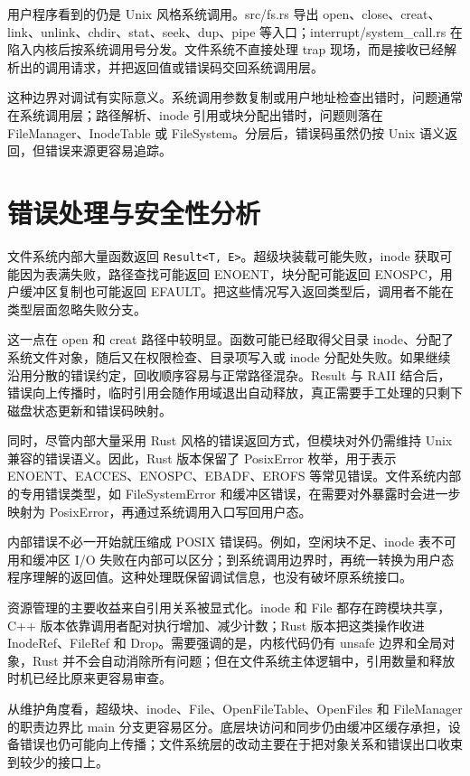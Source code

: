 用户程序看到的仍是 Unix 风格系统调用。src/fs.rs 导出 open、close、creat、link、unlink、chdir、stat、seek、dup、pipe 等入口；interrupt/system\_call.rs 在陷入内核后按系统调用号分发。文件系统不直接处理 trap 现场，而是接收已经解析出的调用请求，并把返回值或错误码交回系统调用层。

这种边界对调试有实际意义。系统调用参数复制或用户地址检查出错时，问题通常在系统调用层；路径解析、inode 引用或块分配出错时，问题则落在 FileManager、InodeTable 或 FileSystem。分层后，错误码虽然仍按 Unix 语义返回，但错误来源更容易追踪。

\section{错误处理与安全性分析}

文件系统内部大量函数返回 \texttt{Result<T, E>}。超级块装载可能失败，inode 获取可能因为表满失败，路径查找可能返回 ENOENT，块分配可能返回 ENOSPC，用户缓冲区复制也可能返回 EFAULT。把这些情况写入返回类型后，调用者不能在类型层面忽略失败分支。

这一点在 open 和 creat 路径中较明显。函数可能已经取得父目录 inode、分配了系统文件对象，随后又在权限检查、目录项写入或 inode 分配处失败。如果继续沿用分散的错误约定，回收顺序容易与正常路径混杂。Result 与 RAII 结合后，错误向上传播时，临时引用会随作用域退出自动释放，真正需要手工处理的只剩下磁盘状态更新和错误码映射。

同时，尽管内部大量采用 Rust 风格的错误返回方式，但模块对外仍需维持 Unix兼容的错误语义。因此，Rust 版本保留了 PosixError 枚举，用于表示 ENOENT、EACCES、ENOSPC、EBADF、EROFS 等常见错误。文件系统内部的专用错误类型，如 FileSystemError 和缓冲区错误，在需要对外暴露时会进一步映射为 PosixError，再通过系统调用入口写回用户态。

内部错误不必一开始就压缩成 POSIX 错误码。例如，空闲块不足、inode 表不可用和缓冲区 I/O 失败在内部可以区分；到系统调用边界时，再统一转换为用户态程序理解的返回值。这种处理既保留调试信息，也没有破坏原系统接口。

资源管理的主要收益来自引用关系被显式化。inode 和 File 都存在跨模块共享，C++ 版本依靠调用者配对执行增加、减少计数；Rust 版本把这类操作收进 InodeRef、FileRef 和 Drop。需要强调的是，内核代码仍有 unsafe 边界和全局对象，Rust 并不会自动消除所有问题；但在文件系统主体逻辑中，引用数量和释放时机已经比原来更容易审查。

从维护角度看，超级块、inode、File、OpenFileTable、OpenFiles 和 FileManager 的职责边界比 main 分支更容易区分。底层块访问和同步仍由缓冲区缓存承担，设备错误也仍可能向上传播；文件系统层的改动主要在于把对象关系和错误出口收束到较少的接口上。

